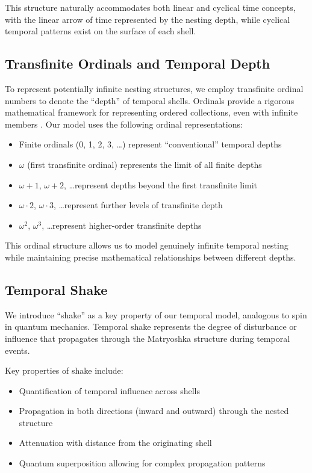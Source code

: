 \documentclass[12pt,a4paper]{article}
\begin{document}
This structure naturally accommodates both linear and cyclical time concepts, with the linear arrow of time represented by the nesting depth, while cyclical temporal patterns exist on the surface of each shell.

\subsection{Transfinite Ordinals and Temporal Depth}

To represent potentially infinite nesting structures, we employ transfinite ordinal numbers to denote the ``depth'' of temporal shells. Ordinals provide a rigorous mathematical framework for representing ordered collections, even with infinite members \citep{cantor, neumann}. Our model uses the following ordinal representations:

\begin{itemize}
    \item Finite ordinals (0, 1, 2, 3, \ldots) represent ``conventional'' temporal depths
    \item $\omega$ (first transfinite ordinal) represents the limit of all finite depths
    \item $\omega+1$, $\omega+2$, \ldots represent depths beyond the first transfinite limit
    \item $\omega \cdot 2$, $\omega \cdot 3$, \ldots represent further levels of transfinite depth
    \item $\omega^2$, $\omega^3$, \ldots represent higher-order transfinite depths
\end{itemize}

This ordinal structure allows us to model genuinely infinite temporal nesting while maintaining precise mathematical relationships between different depths.

\subsection{Temporal Shake}

We introduce ``shake'' as a key property of our temporal model, analogous to spin in quantum mechanics. Temporal shake represents the degree of disturbance or influence that propagates through the Matryoshka structure during temporal events.

Key properties of shake include:

\begin{itemize}
    \item Quantification of temporal influence across shells
    \item Propagation in both directions (inward and outward) through the nested structure
    \item Attenuation with distance from the originating shell
    \item Quantum superposition allowing for complex propagation patterns
\end{itemize}
\end{document}
